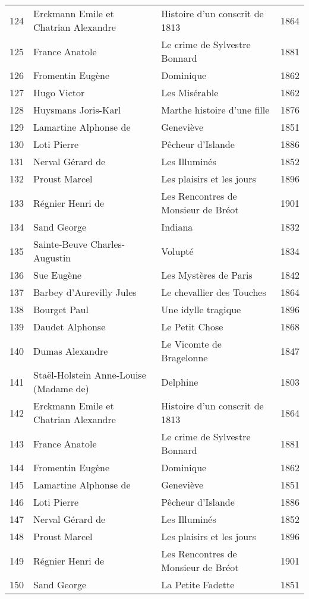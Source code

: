 \begin{table}
\begin{tabular}{l l l l}
    124 & Erckmann Emile et Chatrian Alexandre & Histoire d’un conscrit de 1813 & 1864 \\
    125 & France Anatole & Le crime de Sylvestre Bonnard & 1881 \\
    126 & Fromentin Eugène & Dominique & 1862 \\
    127 & Hugo Victor & Les Misérable & 1862 \\
    128 & Huysmans Joris-Karl & Marthe histoire d’une fille & 1876 \\
    129 & Lamartine Alphonse de & Geneviève & 1851 \\
    130 & Loti Pierre & Pêcheur d’Islande & 1886 \\
    131 & Nerval Gérard de & Les Illuminés & 1852 \\
    132 & Proust Marcel & Les plaisirs et les jours & 1896 \\
    133 & Régnier Henri de & Les Rencontres de Monsieur de Bréot & 1901 \\
    134 & Sand George & Indiana & 1832 \\
    135 & Sainte-Beuve Charles-Augustin & Volupté & 1834 \\
    136 & Sue Eugène & Les Mystères de Paris & 1842 \\
    137 & Barbey d'Aurevilly Jules & Le chevallier des Touches & 1864 \\
    138 & Bourget Paul & Une idylle tragique & 1896 \\
    139 & Daudet Alphonse & Le Petit Chose & 1868 \\
    140 & Dumas Alexandre & Le Vicomte de Bragelonne & 1847 \\
    141 & Staël-Holstein Anne-Louise (Madame de) & Delphine & 1803 \\
    142 & Erckmann Emile et Chatrian Alexandre & Histoire d’un conscrit de 1813 & 1864 \\
    143 & France Anatole & Le crime de Sylvestre Bonnard & 1881 \\
    144 & Fromentin Eugène & Dominique & 1862 \\
    145 & Lamartine Alphonse de & Geneviève & 1851 \\
    146 & Loti Pierre & Pêcheur d’Islande & 1886 \\
    147 & Nerval Gérard de & Les Illuminés & 1852 \\
    148 & Proust Marcel & Les plaisirs et les jours & 1896 \\
    149 & Régnier Henri de & Les Rencontres de Monsieur de Bréot & 1901 \\
    150 & Sand George & La Petite Fadette & 1851 \\
    \bottomrule
  \end{tabular}
\end{table}

